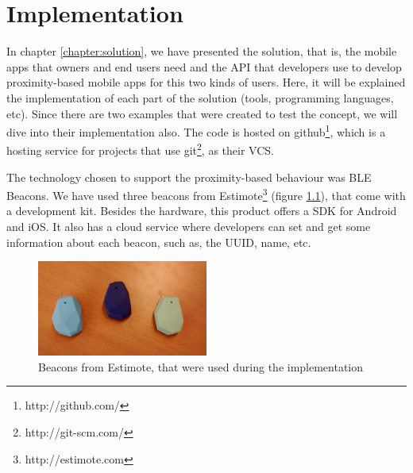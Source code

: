 
\chapter{Implementation}
\label{chapter:implementation}
In chapter \ref{chapter:solution}, we have presented the solution, that is,
the mobile apps that owners and end users need and the API that developers use
to develop proximity-based mobile apps for this two kinds of users.
Here, it will be explained the implementation of each part of the solution
(tools, programming languages, etc). Since there are two examples that were
created to test the concept, we will dive into their implementation also.
The code is hosted on
github\footnote{http://github.com/}, which is a hosting service for projects
that use git\footnote{http://git-scm.com/}, as their \gls{VCS}.

The technology chosen to support the proximity-based behaviour was
\gls{BLE} Beacons.
We have used three beacons from Estimote\footnote{http://estimote.com}
(figure \ref{fig:estimote}), that come with a development kit.
Besides the hardware, this product offers a \gls{SDK} for Android and
iOS. It also has a cloud service where developers can set and get
some information about each beacon, such as, the \gls{UUID}, name, etc.

\begin{figure}[!ht]
  \centering
    \includegraphics[width=0.5\textwidth, keepaspectratio]{images/estimote}
    \caption[Estimote beacons]{Beacons from Estimote, that were used during the implementation}
    \label{fig:estimote}
\end{figure}

